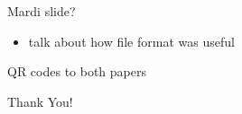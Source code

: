 \documentclass[9pt]{beamer}
\theoremstyle{definition}
\begin{document}

\begin{frame}[fragile]{Mardi slide?}
  \begin{itemize}
  \item talk about how file format was useful
  \end{itemize}
\end{frame}


\begin{frame}[fragile]{}
  \begin{center}
    QR codes to both papers

    Thank You!
  \end{center}
\end{frame}

\end{document}
